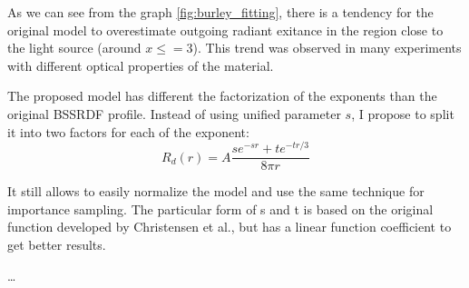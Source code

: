 As we can see from the graph \ref{fig:burley_fitting}, there is a tendency for
the original model to overestimate outgoing radiant exitance in the region close
to the light source (around $x\leq=3$). This trend was observed in many
experiments with different optical properties of the material.

The proposed model has different the factorization of the exponents than the
original \gls{BSSRDF} profile. Instead of using unified parameter $s$, I propose
to split it into two factors for each of the exponent:
\begin{equation}\label{eq:burley_modified}
R_d(r) = A\dfrac{se^{-sr}+te^{-tr/3}}{8\pi r}
\end{equation}

It still allows to easily normalize the model and use the same technique for
importance sampling. The particular form of s and t is based on the original
function developed by Christensen et al., but has a linear function coefficient
to get better results.

\ldots